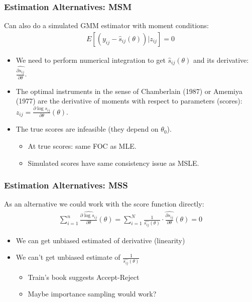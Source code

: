 \documentclass[xcolor=pdftex,dvipsnames,table,mathserif,aspectratio=169]{beamer}
\begin{document}
\begin{frame}
\frametitle{Estimation Alternatives: MSM}
Can also do a simulated GMM estimator with moment conditions:
\begin{align*}
E\left[\left(y_{ij} - \widehat{s}_{ij}(\theta) \right) | z_{ij} \right]=0
\end{align*}
\begin{itemize}
\item We need to perform numerical integration to get $\widehat{s}_{ij}(\theta)$ and its derivative: $\widehat{\frac{\partial s_{ij}}{\partial \theta}}$.
\item The \alert{optimal instruments} in the sense of Chamberlain (1987) or Amemiya (1977) are the derivative of moments with respect to parameters (\alert{scores}): $z_{ij} = \frac{\partial \log s_{ij}}{\partial \theta}(\theta)$.
\item The true scores are infeasible (they depend on $\theta_0$).
\begin{itemize}
\item At true scores: same FOC as MLE.
\item Simulated scores have same consistency issue as MSLE.
\end{itemize}
\end{itemize}
\end{frame}


\begin{frame}
\frametitle{Estimation Alternatives: MSS}
As an alternative we could work with the score function directly:
\begin{align*}
\sum_{i=1}^n\widehat { \frac{\partial \log s_{ij}}{\partial \theta}}(\theta) =\sum_{i=1}^N \frac{1}{\widehat{s_{ij}}(\theta)} \cdot  \widehat{\frac{\partial s_{ij}}{\partial \theta}}(\theta) = 0
\end{align*}
\begin{itemize}
\item We can get unbiased estimated of derivative (linearity)
\item We can't get unbiased estimate of $\frac{1}{\widehat{s_{ij}}(\theta)}$
\begin{itemize}
\item Train's book suggests Accept-Reject 
\item Maybe importance sampling would work?
\end{itemize}
\end{itemize}
\end{frame}
\end{document}
